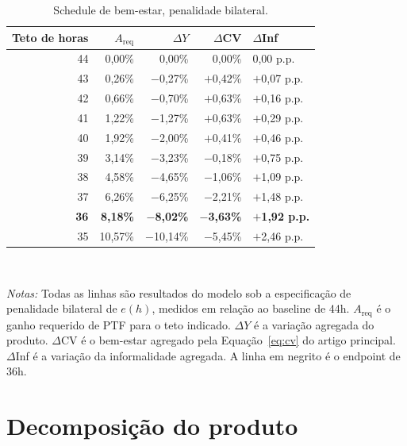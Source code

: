 \documentclass[12pt,a4paper]{article}
\begin{document}
\begin{table}[htbp]
\centering
\caption{Schedule de bem-estar, penalidade bilateral.}\label{tab:welfare_schedule}
\small
\begin{tabular}{rrrrl}
\hline\hline
Teto de horas & $A_{\text{req}}$ & $\Delta Y$ & $\Delta$CV & $\Delta$Inf \\
\hline
44 & 0{,}00\% & 0{,}00\% & 0{,}00\% & 0{,}00 p.p. \\
43 & 0{,}26\% & $-$0{,}27\% & $+$0{,}42\% & $+$0{,}07 p.p. \\
42 & 0{,}66\% & $-$0{,}70\% & $+$0{,}63\% & $+$0{,}16 p.p. \\
41 & 1{,}22\% & $-$1{,}27\% & $+$0{,}63\% & $+$0{,}29 p.p. \\
40 & 1{,}92\% & $-$2{,}00\% & $+$0{,}41\% & $+$0{,}46 p.p. \\
39 & 3{,}14\% & $-$3{,}23\% & $-$0{,}18\% & $+$0{,}75 p.p. \\
38 & 4{,}58\% & $-$4{,}65\% & $-$1{,}06\% & $+$1{,}09 p.p. \\
37 & 6{,}26\% & $-$6{,}25\% & $-$2{,}21\% & $+$1{,}48 p.p. \\
\textbf{36} & \textbf{8{,}18\%} & $-$\textbf{8{,}02\%} & $-$\textbf{3{,}63\%} & $+$\textbf{1{,}92 p.p.} \\
35 & 10{,}57\% & $-$10{,}14\% & $-$5{,}45\% & $+$2{,}46 p.p. \\
\hline\hline
\end{tabular}
\\[2pt]
\begin{minipage}{0.85\textwidth}
\justifying
{\footnotesize \textit{Notas:} Todas as linhas s\~ao resultados do modelo sob a especifica\c{c}\~ao de penalidade bilateral de $e(h)$, medidos em rela\c{c}\~ao ao baseline de 44h. $A_{\text{req}}$ \'e o ganho requerido de PTF para o teto indicado. $\Delta Y$ \'e a varia\c{c}\~ao agregada do produto. $\Delta$CV \'e o bem-estar agregado pela Equa\c{c}\~ao~\eqref{eq:cv} do artigo principal. $\Delta$Inf \'e a varia\c{c}\~ao da informalidade agregada. A linha em negrito \'e o endpoint de 36h.}
\end{minipage}
\end{table}

\clearpage
\section{Decomposi\c{c}\~ao do produto}\label{app:decomposition}
\end{document}
